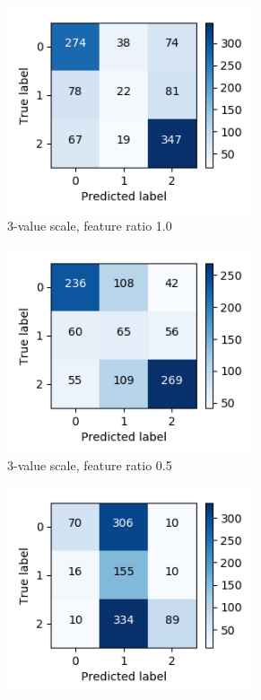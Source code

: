 \documentclass[11pt,a4paper]{article}
\begin{document}
\begin{figure}[ht]
    \centering
    \begin{subfigure}[t]{0.3\textwidth}
        \includegraphics[width=0.8\textwidth]{images/cm3_1.0.png}
        \caption{3-value scale, feature ratio 1.0}
    \end{subfigure}\label{fig:cm310}
    \begin{subfigure}[t]{0.3\textwidth}
        \includegraphics[width=0.8\textwidth]{images/cm3_0.5.png}
        \caption{3-value scale, feature ratio 0.5}
    \end{subfigure}\label{fig:cm305}
    \begin{subfigure}[t]{0.3\textwidth}
        \includegraphics[width=0.8\textwidth]{images/cm3_0.1.png}

\end{subfigure}
\end{figure}
\end{document}
